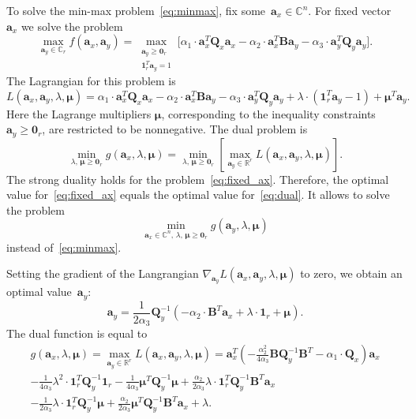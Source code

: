 \documentclass[12pt,twoside]{article}
\newcommand{\ba}{\mathbf{a}}
\newcommand{\bB}{\mathbf{B}}
\newcommand{\bQ}{\mathbf{Q}}
\newcommand{\bbR}{\mathbb{R}}
\newcommand{\bmu}{\boldsymbol{\mu}}
\newcommand{\bOne}{\boldsymbol{1}}
\newcommand{\bZero}{\boldsymbol{0}}
\begin{document}
To solve the min-max problem~\eqref{eq:minmax}, fix some~$\ba_x \in \mathbb{C}^n$. For fixed vector~$\ba_x$ we solve the problem
\begin{equation}
	\max_{\ba_y \in \mathbb{C}_r} f(\ba_x, \ba_y) = \max_{\substack{\ba_y \geq \bZero_r \\ \bOne_r^T\ba_y=1}} \bigl[\alpha_1 \cdot \ba_x^T \bQ_x \ba_x - \alpha_2 \cdot \ba_x^T \bB \ba_y - \alpha_3 \cdot \ba_y^T \bQ_y \ba_y \bigr].
	\label{eq:fixed_ax}
\end{equation}
The Lagrangian for this problem is
\[
	L(\ba_x, \ba_y, \lambda, \bmu) = \alpha_1 \cdot \ba_x^T \bQ_x \ba_x - \alpha_2 \cdot \ba_x^T \bB \ba_y - \alpha_3 \cdot \ba_y^T \bQ_y \ba_y + \lambda \cdot  (\bOne_r^T \ba_y - 1) + \bmu^T \ba_y.
\]
Here the Lagrange multipliers $\bmu$, corresponding to the inequality constraints $\ba_y \geq \bZero_r$, are restricted to be nonnegative. 
The dual problem is
\begin{equation}
	\min_{\lambda, \, \bmu \geq \bZero_r} g(\ba_x, \lambda, \bmu) = \min_{\lambda, \, \bmu \geq \bZero_r}  \left[\max_{\ba_y \in \bbR^r} L(\ba_x, \ba_y, \lambda, \bmu) \right].
	\label{eq:dual}
\end{equation}
The strong duality holds for the problem~\eqref{eq:fixed_ax}. Therefore, the optimal value for~\eqref{eq:fixed_ax} equals the optimal value for~\eqref{eq:dual}. It allows to solve the problem
\begin{equation}
	\min_{\ba_x \in \mathbb{C}^n, \, \lambda, \, \bmu \geq \bZero_r} g(\ba_y, \lambda, \bmu)
	\label{eq:dual_maxmin}
\end{equation}
instead of~\eqref{eq:minmax}.

Setting the gradient of the Langrangian $\nabla_{\ba_y} L(\ba_x, \ba_y, \lambda, \bmu)$ to zero, we obtain an optimal value~$\ba_y$:
\begin{equation}
	\ba_y = \frac{1}{2\alpha_3} \bQ_y^{-1} \left( - \alpha_2 \cdot \bB^T \ba_x +\lambda \cdot \bOne_r + \bmu \right).
	\label{eq:ax}
\end{equation}
The dual function is equal to
\begin{multline}
	g(\ba_x, \lambda, \bmu) 
	= \max_{\ba_y \in \bbR^r} L(\ba_x, \ba_y, \lambda, \bmu) = 
	\ba_x^T \left( - \frac{\alpha_2^2}{4\alpha_3} \bB \bQ_y^{-1} \bB^T - \alpha_1 \cdot \bQ_x\right) \ba_x \\ - \frac{1}{4 \alpha_3} \lambda^2 \cdot \bOne_r^T \bQ_y^{-1} \bOne_r - \frac{1}{4 \alpha_3} \bmu^T \bQ_y^{-1} \bmu + \frac{\alpha_2}{2 \alpha_3} \lambda \cdot \bOne_r^T \bQ_y^{-1} \bB^T \ba_x \\ - \frac{1}{2 \alpha_3} \lambda \cdot \bOne_r^T \bQ_y^{-1} \bmu + \frac{\alpha_2}{2 \alpha_3} \bmu^T \bQ_y^{-1} \bB^T \ba_x + \lambda. 
	 \label{eq:dual_quadratic_form}
\end{multline} 
\end{document}
